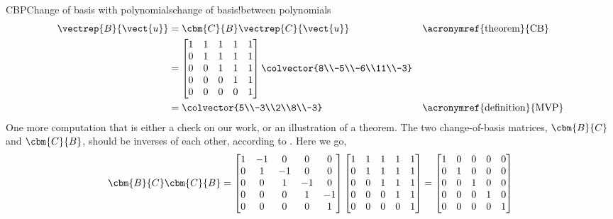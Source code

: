 \begin{example}{CBP}{Change of basis with polynomials}{change of basis!between polynomials}
\begin{align*}
\vectrep{B}{\vect{u}}
&=\cbm{C}{B}\vectrep{C}{\vect{u}}&&\text{\acronymref{theorem}{CB}}\\
%
&=
\begin{bmatrix}
1 & 1 & 1 & 1 & 1\\
0 & 1 & 1 & 1 & 1\\
0 & 0 & 1 & 1 & 1\\
0 & 0 & 0 & 1 & 1\\
0 & 0 & 0 & 0 & 1\\
\end{bmatrix}
\colvector{8\\-5\\-6\\11\\-3}\\
%
&=\colvector{5\\-3\\2\\8\\-3}&&\text{\acronymref{definition}{MVP}}\\
%
\end{align*}
%
One more computation that is either a check on our work, or an illustration of a theorem.  The two change-of-basis matrices, $\cbm{B}{C}$ and $\cbm{C}{B}$, should be inverses of each other, according to .  Here we go,
%
\begin{equation*}
\cbm{B}{C}\cbm{C}{B}=
\begin{bmatrix}
1 &-1 & 0 & 0 & 0\\
0 & 1 &-1 & 0 & 0\\
0 & 0 & 1 &-1 & 0\\
0 & 0 & 0 & 1 &-1\\
0 & 0 & 0 & 0 & 1\\
\end{bmatrix}
%
\begin{bmatrix}
1 & 1 & 1 & 1 & 1\\
0 & 1 & 1 & 1 & 1\\
0 & 0 & 1 & 1 & 1\\
0 & 0 & 0 & 1 & 1\\
0 & 0 & 0 & 0 & 1\\
\end{bmatrix}
=
\begin{bmatrix}
1 & 0 & 0 & 0 & 0\\
0 & 1 & 0 & 0 & 0\\
0 & 0 & 1 & 0 & 0\\
0 & 0 & 0 & 1 & 0\\
0 & 0 & 0 & 0 & 1\\
\end{bmatrix}
%
\end{equation*}
%
\end{example}
